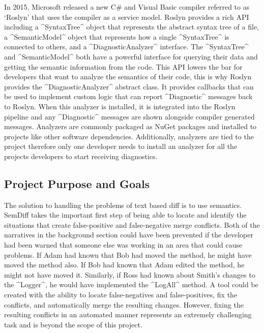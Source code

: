 \documentclass[draftclsnofoot,onecolumn]{IEEEtran}
\begin{document}
In 2015, Microsoft released a new C\# and Visual Basic compiler referred to as 
`Roslyn' that uses the compiler as a service model. Roslyn provides a rich API 
including a ^SyntaxTree^ object that represents the abstract syntax tree of a 
file, a ^SemanticModel^ object that represents how a single ^SyntaxTree^ is 
connected to others, and a ^DiagnosticAnalyzer^ interface. The ^SyntaxTree^ 
and ^SemanticModel^ both have a powerful interface for querying their data and 
getting the semantic information from the code. This API lowers the bar for 
developers that want to analyze the semantics of their code, this is why 
Roslyn provides the ^DiagnosticAnalyzer^ abstract class. It provides callbacks 
that can be used to implement custom logic that can report ^Diagnostic^ 
messages back to Roslyn. When this analyzer is installed, it is integrated 
into the Roslyn pipeline and any ^Diagnostic^ messages are shown alongside 
compiler generated messages. Analyzers are commonly packaged as NuGet 
packages and installed to projects like other software dependencies. 
Additionally, analyzers are tied to the project therefore only one developer 
needs to install an analyzer for all the projects developers to start receiving 
diagnostics.

\subsection{Project Purpose and Goals}%

The solution to handling the problems of text based diff is to use semantics. 
SemDiff takes the important first step of being able to locate and identify 
the situations that create false-positive and false-negative merge conflicts. 
Both of the narratives in the background section could have been prevented if 
the developer had been warned that someone else was working in an area that 
could cause problems. If Adam had known that Bob had moved the method, he 
might have moved the method also. If Bob had known that Adam edited the 
method, he might not have moved it. Similarly, if Ross had known about Smith's 
changes to the ^Logger^, he would have implemented the ^LogAll^ method. A 
tool could be created with the ability to locate false-negatives and 
false-positives, fix the conflicts, and automatically merge the resulting 
changes. However, fixing the resulting conflicts in an automated manner 
represents an extremely challenging task and is beyond the scope of this project.
\end{document}

